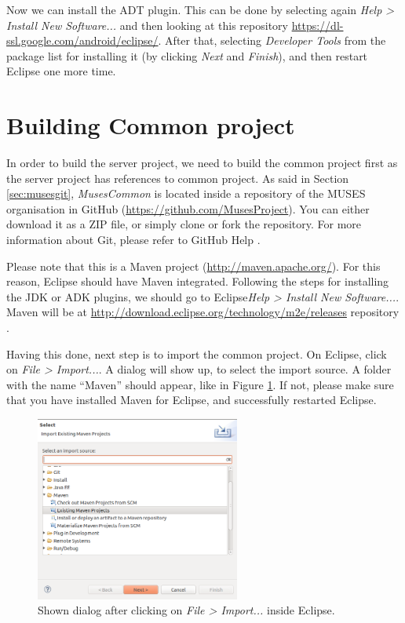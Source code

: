 Now we can install the ADT plugin. This can be done by selecting again \textit{Help > Install New Software...} and then looking at this repository \url{https://dl-ssl.google.com/android/eclipse/}. After that, selecting \textit{Developer Tools} from the package list for installing it (by clicking \textit{Next} and \textit{Finish}), and then restart Eclipse one more time.

\section{Building Common project}
\label{sec:common}

In order to build the server project, we need to build the common project first as the server project has references to common project. As said in Section \ref{sec:musesgit}, \textit{MusesCommon} is located inside a repository of the MUSES organisation in GitHub (\url{https://github.com/MusesProject}). You can either download it as a ZIP file, or simply clone or fork the repository. For more information about Git, please refer to GitHub Help \cite{githelp:site}.

Please note that this is a Maven project (\url{http://maven.apache.org/}). For this reason, Eclipse should have Maven integrated. Following the steps for installing the JDK or ADK plugins, we should go to Eclipse\textit{Help > Install New Software...}. Maven will be at \url{http://download.eclipse.org/technology/m2e/releases} repository \cite{m2eclipse:site}.

Having this done, next step is to import the common project. On Eclipse, click on \textit{File > Import...}. A dialog will show up, to select the import source. A folder with the name ``Maven'' should appear, like in Figure \ref{fig:importdialog}. If not, please make sure that you have installed Maven for Eclipse, and successfully restarted Eclipse.

\begin{figure}
  \begin{center}
    \includegraphics[width=0.6\textwidth]{./Figures/importdialog.png}
    \caption{Shown dialog after clicking on \textit{File > Import...} inside Eclipse.}
    \label{fig:importdialog}
  \end{center}
\end{figure}

